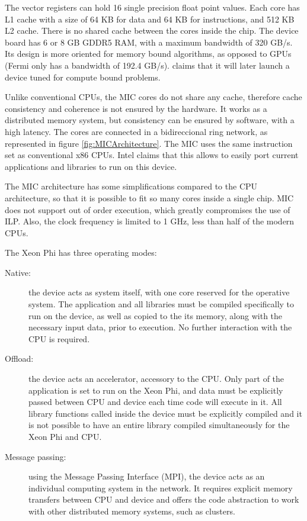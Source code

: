 The vector registers can hold 16 single precision float point values. Each core has L1 cache with a size of 64 KB for data and 64 KB for instructions, and 512 KB L2 cache. There is no shared cache between the cores inside the chip. The device board has 6 or 8 GB GDDR5 RAM, with a maximum bandwidth of 320 GB/s. Its design is more oriented for memory bound algorithms, as opposed to GPUs (Fermi only has a bandwidth of 192.4 GB/s). \intel claims that it will later launch a device tuned for compute bound problems.

Unlike conventional CPUs, the MIC cores do not share any cache, therefore cache consistency and coherence is not ensured by the hardware. It works as a distributed memory system, but consistency can be ensured by software, with a high latency. The cores are connected in a bidireccional ring network, as represented in figure \ref{fig:MICArchitecture}. The MIC uses the same instruction set as conventional x86 CPUs. Intel claims that this allows to easily port current applications and libraries to run on this device.

The MIC architecture has some simplifications compared to the CPU architecture, so that it is possible to fit so many cores inside a single chip. MIC does not support out of order execution, which greatly compromises the use of ILP. Also, the clock frequency is limited to 1 GHz, less than half of the modern CPUs.

The Xeon Phi has three operating modes:

\begin{description}
	\item[Native:] the device acts as system itself, with one core reserved for the operative system. The application and all libraries must be compiled specifically to run on the device, as well as copied to the its memory, along with the necessary input data, prior to execution. No further interaction with the CPU is required.
	\item[Offload:] the device acts an accelerator, accessory to the CPU. Only part of the application is set to run on the Xeon Phi, and data must be explicitly passed between CPU and device each time code will execute in it. All library functions called inside the device must be explicitly compiled and it is not possible to have an entire library compiled simultaneously for the Xeon Phi and CPU.
	\item[Message passing:] using the Message Passing Interface (MPI), the device acts as an individual computing system in the network. It requires explicit memory transfers between CPU and device and offers the code abstraction to work with other distributed memory systems, such as clusters.
\end{description}

